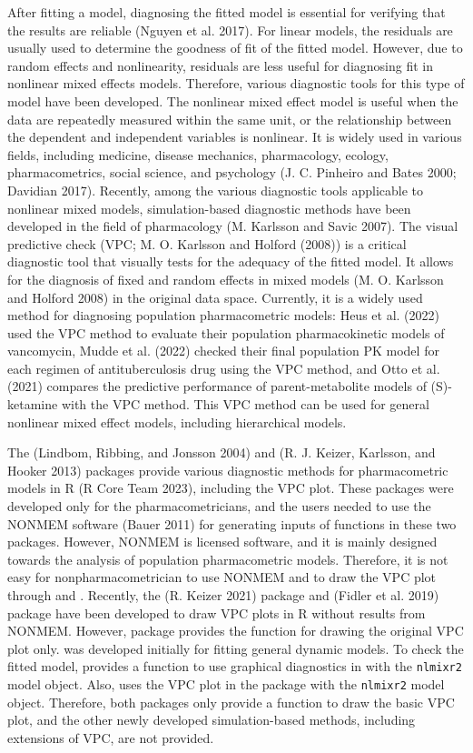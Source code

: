 After fitting a model, diagnosing the fitted model is essential for verifying that the results are reliable (Nguyen et al. 2017). For linear models, the residuals are usually used to determine the goodness of fit of the fitted model. However, due to random effects and nonlinearity, residuals are less useful for diagnosing fit in nonlinear mixed effects models. Therefore, various diagnostic tools for this type of model have been developed. The nonlinear mixed effect model is useful when the data are repeatedly measured within the same unit, or the relationship between the dependent and independent variables is nonlinear. It is widely used in various fields, including medicine, disease mechanics, pharmacology, ecology, pharmacometrics, social science, and psychology (J. C. Pinheiro and Bates 2000; Davidian 2017). Recently, among the various diagnostic tools applicable to nonlinear mixed models, simulation-based diagnostic methods have been developed in the field of pharmacology (M. Karlsson and Savic 2007). The visual predictive check (VPC; M. O. Karlsson and Holford (2008)) is a critical diagnostic tool that visually tests for the adequacy of the fitted model. It allows for the diagnosis of fixed and random effects in mixed models (M. O. Karlsson and Holford 2008) in the original data space.
Currently, it is a widely used method for diagnosing population pharmacometric models:
Heus et al. (2022) used the VPC method to evaluate their population pharmacokinetic models of vancomycin, Mudde et al. (2022) checked their final population PK model for each regimen of antituberculosis drug using the VPC method, and Otto et al. (2021) compares the predictive performance of parent-metabolite models of (S)-ketamine with the VPC method. This VPC method can be used for general nonlinear mixed effect models, including hierarchical models.

The  (Lindbom, Ribbing, and Jonsson 2004) and  (R. J. Keizer, Karlsson, and Hooker 2013) packages provide various diagnostic methods for pharmacometric models in R (R Core Team 2023), including the VPC plot. These packages were developed only for the pharmacometricians, and the users needed to use the NONMEM software (Bauer 2011) for generating inputs of functions in these two packages. However, NONMEM is licensed software, and it is mainly designed towards the analysis of population pharmacometric models. Therefore, it is not easy for nonpharmacometrician to use NONMEM and to draw the VPC plot through  and . Recently, the  (R. Keizer 2021) package and  (Fidler et al. 2019) package have been developed to draw VPC plots in R without results from NONMEM. However,  package provides the function for drawing the original VPC plot only.  was developed initially for fitting general dynamic models. To check the fitted model,  provides a function to use graphical diagnostics in  with the \texttt{nlmixr2} model object. Also,  uses the VPC plot in the  package with the \texttt{nlmixr2} model object. Therefore, both packages only provide a function to draw the basic VPC plot, and the other newly developed simulation-based methods, including extensions of VPC, are not provided.

